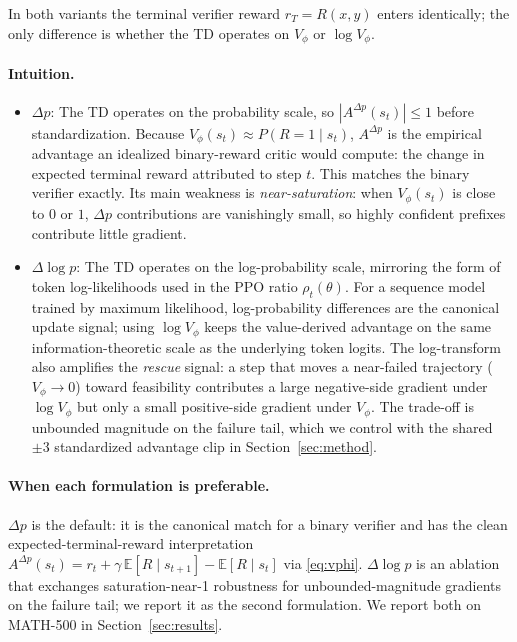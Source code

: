 \documentclass[11pt]{article}
\begin{document}
In both variants the terminal verifier reward $r_T = R(x,y)$ enters
identically; the only difference is whether the TD operates on
$V_\phi$ or $\log V_\phi$.

\paragraph{Intuition.}
\begin{itemize}
\item $\Delta p$: The TD operates on the probability scale, so
$|A^{\Delta p}(s_t)| \leq 1$ before standardization. Because
$V_\phi(s_t) \approx P(R = 1 \mid s_t)$, $A^{\Delta p}$ is the
empirical advantage an idealized binary-reward critic would compute:
the change in expected terminal reward attributed to step $t$. This
matches the binary verifier exactly. Its main weakness is
\emph{near-saturation}: when $V_\phi(s_t)$ is close to $0$ or $1$,
$\Delta p$ contributions are vanishingly small, so highly confident
prefixes contribute little gradient.

\item $\Delta\log p$: The TD operates on the log-probability scale,
mirroring the form of token log-likelihoods used in the PPO ratio
$\rho_t(\theta)$. For a sequence model trained by maximum likelihood,
log-probability differences are the canonical update signal; using
$\log V_\phi$ keeps the value-derived advantage on the same
information-theoretic scale as the underlying token logits. The
log-transform also amplifies the \emph{rescue} signal: a step that
moves a near-failed trajectory ($V_\phi \to 0$) toward feasibility
contributes a large negative-side gradient under $\log V_\phi$ but
only a small positive-side gradient under $V_\phi$. The trade-off is
unbounded magnitude on the failure tail, which we control with the
shared $\pm 3$ standardized advantage clip in
Section~\ref{sec:method}.
\end{itemize}

\paragraph{When each formulation is preferable.}
$\Delta p$ is the default: it is the canonical match for a binary
verifier and has the clean expected-terminal-reward interpretation
$A^{\Delta p}(s_t) = r_t + \gamma\, \mathbb{E}[R \mid s_{t+1}] -
\mathbb{E}[R \mid s_t]$ via \eqref{eq:vphi}. $\Delta\log p$ is an
ablation that exchanges saturation-near-1 robustness for
unbounded-magnitude gradients on the failure tail; we report it as
the second formulation. We report both on MATH-500 in
Section~\ref{sec:results}.
\end{document}
